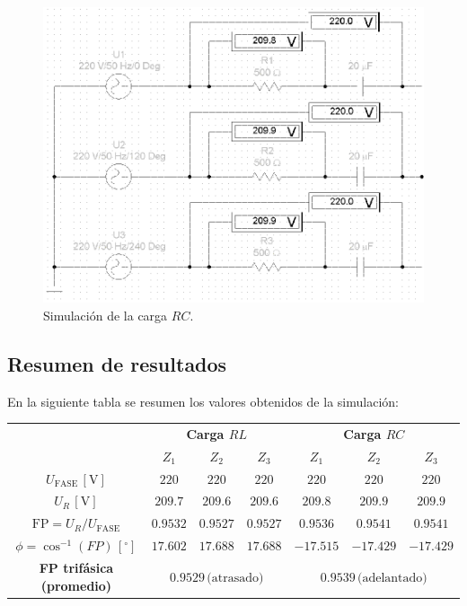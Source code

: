 \documentclass[letter,11pt]{article}
\begin{document}
\begin{figure}[!h]
\centering
\includegraphics[scale=1.06]{simulacion/practica7.2.eps}
\caption{Simulación de la carga $RC$.}
\label{simulacion2}
\end{figure}

\subsection{Resumen de resultados}
En la siguiente tabla se resumen los valores obtenidos de la simulación: 
\begin{center}
    \begin{tabular}{|c||c|c|c||c|c|c|}
    \hline
    \multirow{2}{*}{} &
    \multicolumn{3}{|c||}{\textbf{Carga $RL$}} &
    \multicolumn{3}{|c|}{\textbf{Carga $RC$}}\\
    & $Z_1$ & $Z_2$ & $Z_3$ & $Z_1$ & $Z_2$ & $Z_3$\\
    \hline \hline
    $U_{\text{FASE}}\,[\text{V}]$ &
    $220$ &
    $220$ &
    $220$ &
    $220$ &
    $220$ &
    $220$
    \tabularnewline \hline
    $U_R\,[\text{V}]$ &
    $209.7$ &
    $209.6$ &
    $209.6$ &
    $209.8$ &
    $209.9$ &
    $209.9$
    \tabularnewline \hline
    $\text{FP} = U_R/U_{\text{FASE}}$ &
    $0.9532$ &
    $0.9527$ &
    $0.9527$ &
    $0.9536$ &
    $0.9541$ &
    $0.9541$
    \tabularnewline \hline
    $\phi = \cos^{-1}(FP)\,[^{\circ}]$ &
    $17.602$ &
    $17.688$ &
    $17.688$ &
    $-17.515$ &
    $-17.429$ &
    $-17.429$
    \tabularnewline \hline \hline
    \textbf{FP trifásica (promedio)} &
    \multicolumn{3}{|c||}{$0.9529\,\text{(atrasado)}$} &
    \multicolumn{3}{|c|}{$0.9539\,\text{(adelantado)}$}
    \tabularnewline \hline
    \end{tabular}
\end{center}
\end{document}
